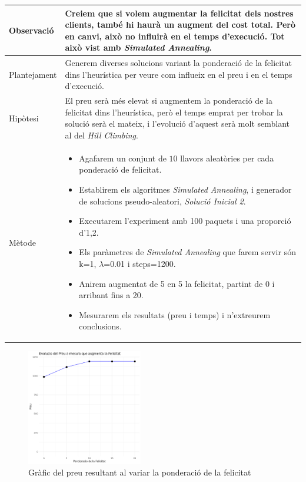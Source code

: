 \documentclass[a4paper]{article}
\begin{document}
	\begin{table}[ht]
		\centering
		\begin{tabular}{|l|p{10cm}|}
			\hline
			Observació & Creiem que si volem augmentar la felicitat dels nostres clients, també hi haurà un augment del cost total. Però en canvi, això no influirà en el temps d'execució. Tot això vist amb \textit{Simulated Annealing}. \\
			\hline
			Plantejament & Generem diverses solucions variant la ponderació de la felicitat dins l'heurística per veure com influeix en el preu i en el temps d'execució. \\
			\hline
			Hipòtesi & El preu serà més elevat si augmentem la ponderació de la felicitat dins l'heurística, però el temps emprat per trobar la solució serà el mateix, i l'evolució d'aquest serà molt semblant al del \textit{Hill Climbing}. \\
			\hline
			Mètode & 
			\begin{itemize}
				\item Agafarem un conjunt de $10$ llavors aleatòries per cada ponderació de felicitat.
				\item Establirem els algoritmes \textit{Simulated Annealing}, i generador de solucions pseudo-aleatori, \textit{Solució Inicial 2}.
				\item Executarem l'experiment amb 100 paquets i una proporció d'1,2.
				\item Els paràmetres de \textit{Simulated Annealing} que farem servir són k=1, $\lambda$=0.01 i steps=1200.
				\item Anirem augmentat de 5 en 5 la felicitat, partint de 0 i arribant fins a 20.
				\item Mesurarem els resultats (preu i temps) i n'extreurem conclusions.
			\end{itemize} \\
			\hline
		\end{tabular}
		\label{tab:exp7_apartats}
	\end{table}
	
		\begin{figure}[H]
		\centering
		\includegraphics[width=0.45\textwidth]{images/exp6_grafic.png}
		\caption{Gràfic del preu resultant al variar la ponderació de la felicitat}
		\label{fig:exp7_grafic}
	\end{figure}
	
\end{document}
